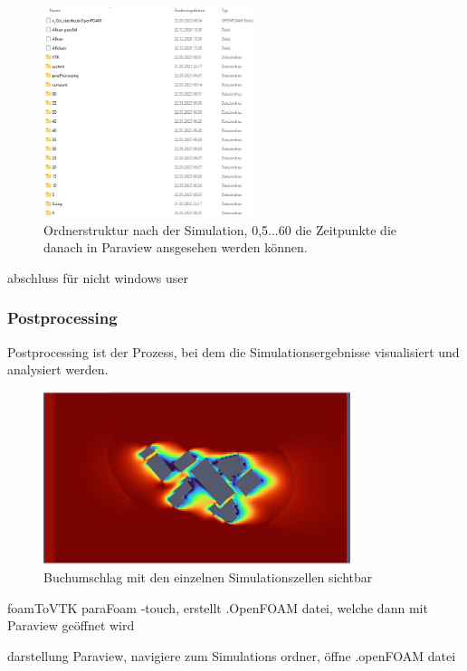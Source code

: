 \begin{figure}
    \centering
    \includegraphics[width=0.55\textwidth]{papers/openfoam/Bilder/Ordnerstruktur_Simuliert.jpg}
    \caption{Ordnerstruktur nach der Simulation, 0,5...60 die Zeitpunkte die danach in Paraview ansgesehen werden können.}
    \label{fig:ordStrktSim}
\end{figure}




abschluss für nicht windows user



\subsubsection{Postprocessing}
Postprocessing ist der Prozess, bei dem die Simulationsergebnisse visualisiert und analysiert werden. 

\begin{figure}
    \centering
    \includegraphics[width=0.8\textwidth]{papers/openfoam/Bilder/vorschlag_Wind_Westen_10m_blocky.png}
    \caption{Buchumschlag mit den einzelnen Simulationszellen sichtbar}
    \label{fig:vorschWindWestBlocky}
\end{figure}



foamToVTK
paraFoam -touch, erstellt .OpenFOAM datei, welche dann mit Paraview geöffnet wird

darstellung
Paraview, navigiere zum Simulations ordner, öffne .openFOAM datei

